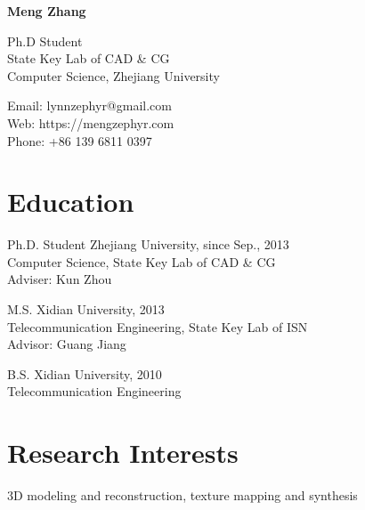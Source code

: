 \documentclass[11pt,letterpaper]{report}
\newcommand{\myname}{Meng Zhang}
\newcommand{\namefont}[1]{{\normalfont\bfseries\Huge{#1}}}
\newcommand{\listitemspace}{0.15em}
\renewenvironment{itemize}
{\begin{list}{}{\setlength{\leftmargin}{0em}
				\setlength{\parskip}{0em}
				\setlength{\itemsep}{\listitemspace}
				\setlength{\parsep}{\listitemspace}}}
{\end{list}}
\begin{document}
\raggedright

\namefont{\myname}

\vspace{1em}
\begin{minipage}[t]{0.495\textwidth}
  Ph.D Student \\
  State Key Lab of CAD \& CG\\
  Computer Science, Zhejiang University \\
\end{minipage}
\begin{minipage}[t]{0.495\textwidth}
  Email: lynnzephyr@gmail.com \\
  Web: https://mengzephyr.com \\
  Phone: +86 139 6811 0397
\end{minipage}
\vspace{1em}



\section*{Education}

\begin{tablist}
	
\item[Ph.D. Student] \tab Zhejiang University, since Sep., 2013 \\
					   \tab Computer Science, State Key Lab of CAD \& CG \\ 
                     \tab Adviser: Kun Zhou 
                  
\item[M.S.]  \tab \tab Xidian University, 2013 \\
			  \tab Telecommunication Engineering, State Key Lab of ISN \\
			  \tab Advisor: Guang Jiang 

\item[B.S.]  \tab \tab Xidian University, 2010 \\
			  \tab Telecommunication Engineering

\end{tablist}


\section*{Research Interests}

\begin{itemize}

\item 3D modeling and reconstruction, texture mapping and synthesis

\end{itemize}
\end{document}
